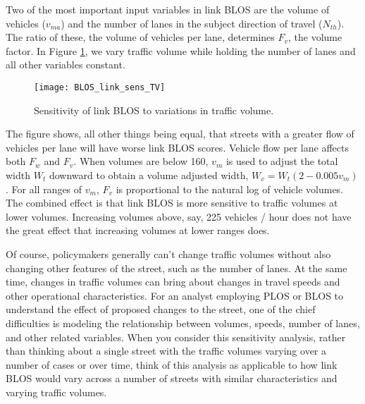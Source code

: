 \documentclass[11pt]{article} %
\begin{document}
Two of the most important input variables in link BLOS are the volume of vehicles ($v_{ma}$) and the number of lanes in the subject direction of travel ($N_{th}$). The ratio of these, the volume of vehicles per lane, determines $F_v$, the volume factor. In Figure \ref{fig:BLOS_link_sens_TV}, we vary traffic volume while holding the number of lanes and all other variables constant. 


\begin{figure}
\centering

\texttt{[image: BLOS\_link\_sens\_TV]}


\caption{Sensitivity of link BLOS to variations in traffic volume.}

\label{fig:BLOS_link_sens_TV}

\end{figure}

The figure shows, all other things being equal, that streets with a greater flow of vehicles per lane will have worse link BLOS scores. Vehicle flow per lane affects both $F_w$ and $F_v$. When volumes are below 160, $v_m$ is used to adjust the total width $W_t$ downward to obtain a volume adjusted width, $W_v = W_t (2-0.005 v_m)$. For all ranges of $v_m$, $F_v$ is proportional to the natural log of vehicle volumes. The combined effect is that link BLOS is more sensitive to traffic volumes at lower volumes. Increasing volumes above, say, 225 vehicles / hour does not have the great effect that increasing volumes at lower ranges does. 

Of course, policymakers generally can't change traffic volumes without also changing other features of the street, such as the number of lanes. At the same time, changes in traffic volumes can bring about changes in travel speeds and other operational characteristics. For an analyst employing PLOS or BLOS to understand the effect of proposed changes to the street, one of the chief difficulties is modeling the relationship between volumes, speeds, number of lanes, and other related variables. When you consider this sensitivity analysis, rather than thinking about a single street with the traffic volumes varying over a number of cases or over time, think of this analysis as applicable to how link BLOS would vary across a number of streets with similar characteristics and varying traffic volumes.



\end{document}

